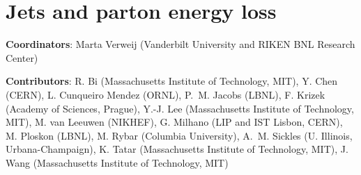 \documentclass[../report.tex]{subfiles}
\providecommand{\main}{..}
\begin{document}
\section{Jets and parton energy loss}\label{sec:HI_Jets}

{ \small
  \noindent \textbf{Coordinators}: Marta Verweij (Vanderbilt University and RIKEN BNL Research Center)
  
  \noindent \textbf{Contributors}:
R. Bi (Massachusetts Institute of Technology, MIT),
Y. Chen (CERN),
L. Cunqueiro Mendez (ORNL),
P.~M. Jacobs (LBNL),
F. Krizek (Academy of Sciences, Prague),
Y.-J. Lee (Massachusetts Institute of Technology, MIT),
M. van Leeuwen (NIKHEF),
G. Milhano (LIP and IST Lisbon, CERN),
M. Ploskon (LBNL),
M. Rybar (Columbia University),
A.~M. Sickles (U. Illinois, Urbana-Champaign),
K. Tatar (Massachusetts Institute of Technology, MIT),
J. Wang  (Massachusetts Institute of Technology, MIT)
}



\newpage

\newpage

\newpage

\end{document}
